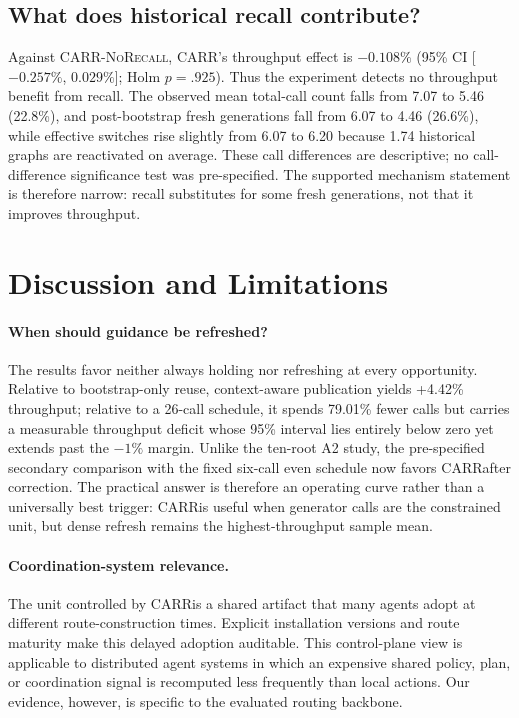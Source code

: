 \documentclass[sigconf,anonymous,review]{acmart}
\newcommand{\carr}{\textsc{CARR}}
\newcommand{\norecall}{\textsc{CARR-NoRecall}}
\begin{document}
\subsection{What does historical recall contribute?}

Against \norecall, \carr's throughput effect is $-0.108\%$ (95\% CI
[$-0.257\%$, $0.029\%$]; Holm $p=.925$). Thus the experiment detects no
throughput benefit from recall. The observed mean total-call count falls from
7.07 to 5.46 (22.8\%), and post-bootstrap fresh generations fall from 6.07 to
4.46 (26.6\%), while effective switches rise slightly from 6.07 to 6.20 because
1.74 historical graphs are reactivated on average. These call differences are
descriptive; no call-difference significance test was pre-specified. The
supported mechanism statement is therefore narrow: recall substitutes for some
fresh generations, not that it improves throughput.

\section{Discussion and Limitations}

\paragraph{When should guidance be refreshed?}
The results favor neither always holding nor refreshing at every opportunity.
Relative to bootstrap-only reuse, context-aware publication yields +4.42\%
throughput; relative to a 26-call schedule, it spends 79.01\% fewer calls but
carries a measurable throughput deficit whose 95\% interval lies entirely
below zero yet extends past the $-1\%$ margin. Unlike the ten-root A2 study,
the pre-specified secondary comparison with the fixed six-call even schedule
now favors \carr after correction. The practical answer is therefore an
operating curve rather than a universally best trigger: \carr is useful when
generator calls are the constrained unit, but dense refresh remains the
highest-throughput sample mean.

\paragraph{Coordination-system relevance.}
The unit controlled by \carr is a shared artifact that many agents adopt at
different route-construction times. Explicit installation versions and route
maturity make this delayed adoption auditable. This control-plane view is
applicable to distributed agent systems in which an expensive shared policy,
plan, or coordination signal is recomputed less frequently than local actions.
Our evidence, however, is specific to the evaluated routing backbone.
\end{document}
